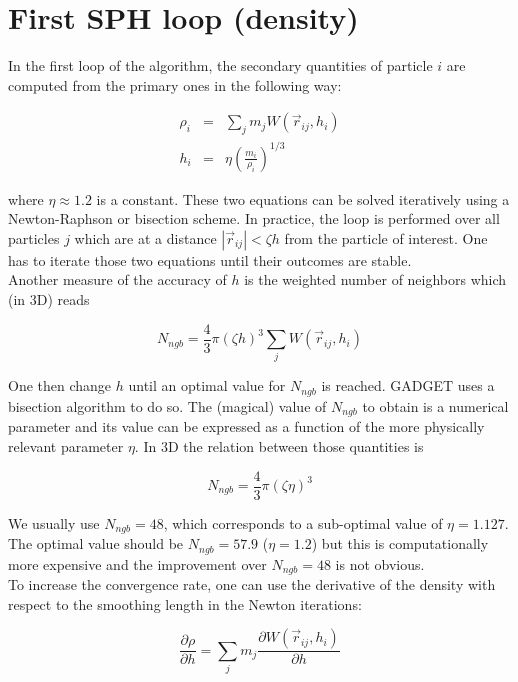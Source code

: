 \documentclass[a4paper,10pt]{article}
\begin{document}
\section{First SPH loop (density)}

In the first loop of the algorithm, the secondary quantities of particle $i$ are computed from the primary ones in the
following way:

\begin{eqnarray}
 \rho_i &=& \sum_j m_j W(\vec{r}_{ij}, h_i)\\
 h_i &=& \eta \left(\frac{m_i}{\rho_i} \right)^{1/3}
\end{eqnarray}

where $\eta \approx 1.2$ is a constant. These two equations can be solved iteratively using a Newton-Raphson or
bisection scheme. In practice, the loop is performed over all particles $j$ which are at a distance
$|\vec{r}_{ij}|<\zeta
h$ from the particle of interest. One has to iterate those two equations until their outcomes are stable.\\
Another measure of the accuracy of $h$ is the weighted number of neighbors which (in 3D) reads

\begin{equation}
 N_{ngb} = \frac{4}{3}\pi \left(\zeta h\right)^3 \sum_j W(\vec{r}_{ij},h_i)
\end{equation}

One then change $h$ until an optimal value for $N_{ngb}$ is reached. GADGET uses a bisection algorithm to do so.
The (magical) value of $N_{ngb}$ to obtain is a numerical parameter and its value can be expressed as a function of the
more physically relevant parameter $\eta$. In 3D the relation between those quantities is

\begin{equation}
 N_{ngb} = \frac{4}{3}\pi\left(\zeta \eta\right)^3
\end{equation}

We usually use $N_{ngb} = 48$, which corresponds to a sub-optimal value of $\eta=1.127$. The optimal value should be
$N_{ngb}=57.9$ ($\eta=1.2$) but this is computationally more expensive and the improvement over $N_{ngb}=48$ is not
obvious.\\ 

To increase the convergence rate, one can use the derivative of the density with respect to the smoothing length in the
Newton iterations:

\begin{equation}
 \frac{\partial \rho}{\partial h} = \sum_j m_j \frac{\partial W(\vec{r}_{ij},h_i)}{\partial h}
\end{equation}
\end{document}
